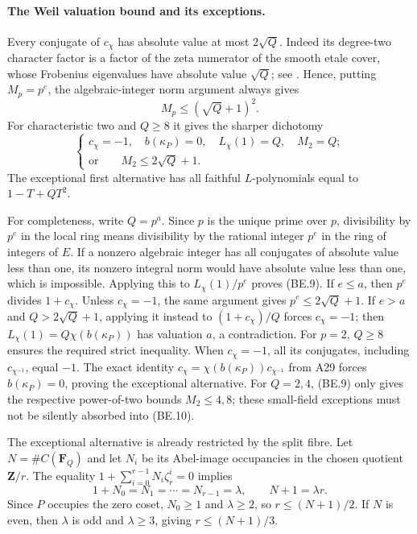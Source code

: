\paragraph{The Weil valuation bound and its exceptions.}
Every conjugate of $c_\chi$ has absolute value at most
$2\sqrt Q$. Indeed its degree-two character factor is a
factor of the zeta numerator of the smooth etale cover,
whose Frobenius eigenvalues have absolute value $\sqrt Q$;
see \cite[Theorem~1.6]{WeilI}. Hence, putting $M_p=p^e$,
the algebraic-integer norm argument always gives
\[
                         M_p\le(\sqrt Q+1)^2.
 \tag{BE.9}
\]
For characteristic two and $Q\ge8$ it gives the sharper
dichotomy
\[
 \begin{cases}
 c_\chi=-1,\quad b(\kappa_P)=0,
                  \quad L_\chi(1)=Q,\quad M_2=Q;\\[2pt]
 \text{or}\qquad M_2\le2\sqrt Q+1.
 \end{cases}
 \tag{BE.10}
\]
The exceptional first alternative has all faithful
$L$-polynomials equal to $1-T+QT^2$.

For completeness, write $Q=p^a$.
Since $p$ is the unique prime over $p$, divisibility by
$p^e$ in the local ring means divisibility by the rational
integer $p^e$ in the ring of integers of $E$.
If a nonzero algebraic integer has all conjugates of
absolute value less than one, its nonzero integral norm
would have absolute value less than one, which is impossible.
Applying this to $L_\chi(1)/p^e$ proves (BE.9).
If $e\le a$, then $p^e$ divides $1+c_\chi$. Unless
$c_\chi=-1$, the same argument gives $p^e\le2\sqrt Q+1$.
If $e>a$ and $Q>2\sqrt Q+1$, applying it instead to
$(1+c_\chi)/Q$ forces $c_\chi=-1$; then
$L_\chi(1)=Q\chi(b(\kappa_P))$ has valuation $a$, a
contradiction. For $p=2$, $Q\ge8$ ensures the required
strict inequality. When $c_\chi=-1$, all its conjugates,
including $c_{\chi^{-1}}$, equal $-1$. The exact identity
$c_\chi=\chi(b(\kappa_P))c_{\chi^{-1}}$ from A29 forces
$b(\kappa_P)=0$, proving the exceptional alternative.
For $Q=2,4$, (BE.9) only gives the respective power-of-two
bounds $M_2\le4,8$; these small-field exceptions must not
be silently absorbed into (BE.10).

The exceptional alternative is already restricted by the
split fibre. Let $N=\#C(\mathbf F_Q)$ and let $N_i$ be its
Abel-image occupancies in the chosen quotient $\mathbf Z/r$.
The equality $1+\sum_{i=0}^{r-1}N_i\zeta_r^i=0$ implies
\[
 1+N_0=N_1=\cdots=N_{r-1}=\lambda,\qquad
 N+1=\lambda r.
 \tag{BE.11}
\]
Since $P$ occupies the zero coset, $N_0\ge1$ and
$\lambda\ge2$, so $r\le(N+1)/2$. If $N$ is even, then
$\lambda$ is odd and $\lambda\ge3$, giving
$r\le(N+1)/3$.

